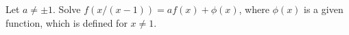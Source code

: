 Let $a \neq \pm 1$. Solve $f(x/(x - 1)) = af(x) + \phi(x)$, where $\phi(x)$ is a given function, which is defined for $x \neq 1$.
